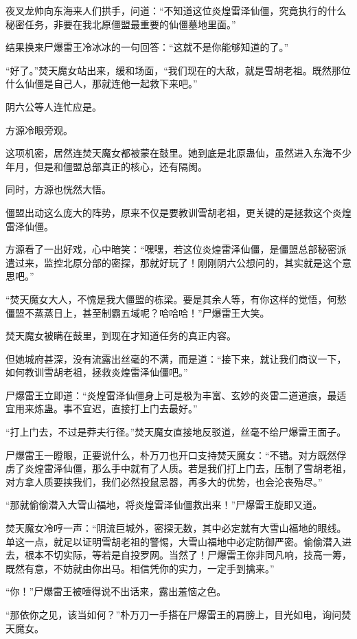 \begin{this_body}
夜叉龙帅向东海来人们拱手，问道：“不知道这位炎煌雷泽仙僵，究竟执行的什么秘密任务，非要在我北原僵盟最重要的仙僵墓地里面。”

结果换来尸爆雷王冷冰冰的一句回答：“这就不是你能够知道的了。”

“好了。”焚天魔女站出来，缓和场面，“我们现在的大敌，就是雪胡老祖。既然那位什么仙僵是自己人，那就连他一起救下来吧。”

阴六公等人连忙应是。

方源冷眼旁观。

这项机密，居然连焚天魔女都被蒙在鼓里。她到底是北原蛊仙，虽然进入东海不少年月，但是和僵盟总部真正的核心，还有隔阂。

同时，方源也恍然大悟。

僵盟出动这么庞大的阵势，原来不仅是要教训雪胡老祖，更关键的是拯救这个炎煌雷泽仙僵。

方源看了一出好戏，心中暗笑：“嘿嘿，若这位炎煌雷泽仙僵，是僵盟总部秘密派遣过来，监控北原分部的密探，那就好玩了！刚刚阴六公想问的，其实就是这个意思吧。”

“焚天魔女大人，不愧是我大僵盟的栋梁。要是其余人等，有你这样的觉悟，何愁僵盟不蒸蒸日上，甚至制霸五域呢？哈哈哈！”尸爆雷王大笑。

焚天魔女被瞒在鼓里，到现在才知道任务的真正内容。

但她城府甚深，没有流露出丝毫的不满，而是道：“接下来，就让我们商议一下，如何教训雪胡老祖，拯救炎煌雷泽仙僵吧。”

尸爆雷王立即道：“炎煌雷泽仙僵身上可是极为丰富、玄妙的炎雷二道道痕，最适宜用来炼蛊。事不宜迟，直接打上门去最好。”

“打上门去，不过是莽夫行径。”焚天魔女直接地反驳道，丝毫不给尸爆雷王面子。

尸爆雷王一瞪眼，正要说什么，朴万刀也开口支持焚天魔女：“不错。对方既然俘虏了炎煌雷泽仙僵，那么手中就有了人质。若是我们打上门去，压制了雪胡老祖，对方拿人质要挟我们，我们必然投鼠忌器，再多大的优势，也会沦丧殆尽。”

“那就偷偷潜入大雪山福地，将炎煌雷泽仙僵救出来！”尸爆雷王旋即又道。

焚天魔女冷哼一声：“阴流巨城外，密探无数，其中必定就有大雪山福地的眼线。单这一点，就足以证明雪胡老祖的警惕，大雪山福地中必定防御严密。偷偷潜入进去，根本不切实际，等若是自投罗网。当然了！尸爆雷王你非同凡响，技高一筹，既然有意，不妨就由你出马。相信凭你的实力，一定手到擒来。”

“你！”尸爆雷王被噎得说不出话来，露出羞恼之色。

“那依你之见，该当如何？”朴万刀一手搭在尸爆雷王的肩膀上，目光如电，询问焚天魔女。


\end{this_body}
